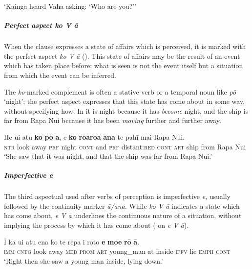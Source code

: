 \glt 
‘Kainga heard Vaha asking: ‘Who are you?’’ \textstyleExampleref{[Mtx-3-01.127]}
\z

\subparagraph{Perfect aspect \textit{ko V {\ꞌ}ā}} When the clause expresses a state of affairs which is perceived, it is marked with the perfect aspect \textit{ko V {\ꞌ}ā} (). This state of affairs may be the result of an event which has taken place before; what is seen is not the event itself but a situation from which the event can be inferred. 

The \textit{ko}{}-marked complement is often a stative verb or a temporal noun like \textit{pō} ‘night’; the perfect aspect expresses that this state has come about in some way, without specifying how. In  it is night because it has \textit{become} night, and the ship is far from Rapa Nui because it has been \textit{moving} further and further away. 

\ea\label{ex:11.35}
\gll He u{\ꞌ}i atu \textbf{ko} \textbf{pō} \textbf{{\ꞌ}ā}, {\ꞌ}e \textbf{ko} \textbf{roaroa} \textbf{{\ꞌ}ana} te pahī mai Rapa Nui.\\
\textsc{ntr} look away \textsc{prf} night \textsc{cont} and \textsc{prf} distant:\textsc{red} \textsc{cont} \textsc{art} ship from Rapa Nui\\

\glt 
‘She saw that it was night, and that the ship was far from Rapa Nui.’ \textstyleExampleref{[R210.116]} 
\z

\subparagraph{Imperfective \textit{e}} The third aspectual used after verbs of perception is imperfective \textit{e}, usually followed by the continuity marker \textit{{\ꞌ}ā/{\ꞌ}ana}. While \textit{ko V {\ꞌ}ā} indicates a state which has come about, \textit{e V {\ꞌ}ā} underlines the continuous nature of a situation, without implying the process by which it has come about ( on \textit{e V {\ꞌ}ā}).

\ea\label{ex:11.36}
\gll {\ꞌ}Ī ka u{\ꞌ}i atu ena ko te repa {\ꞌ}i roto \textbf{e} \textbf{moe} \textbf{rō} \textbf{{\ꞌ}ā}. \\
\textsc{imm} \textsc{cntg} look away \textsc{med} \textsc{prom} \textsc{art} young\_man at inside \textsc{ipfv} lie \textsc{emph} \textsc{cont} \\

\glt 
‘Right then she saw a young man inside, lying down.’ \textstyleExampleref{[R310.045]} 
\z

